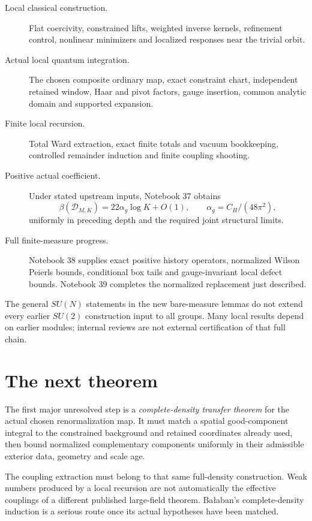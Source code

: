 \documentclass[11pt]{article}
\theoremstyle{remark}
\begin{document}
\begin{description}
\item[Local classical construction.]
Flat coercivity, constrained lifts, weighted
inverse kernels, refinement control, nonlinear
minimizers and localized responses near the
trivial orbit.
\item[Actual local quantum integration.]
The chosen composite ordinary map, exact
constraint chart, independent retained window,
Haar and pivot factors, gauge insertion,
common analytic domain and supported expansion.
\item[Finite local recursion.]
Total Ward extraction, exact finite totals
and vacuum bookkeeping, controlled remainder
induction and finite coupling shooting.
\item[Positive actual coefficient.]
Under stated upstream inputs, Notebook 37
obtains
\[
 \beta(\mathcal D_{M,K})=22\alpha_g\log K+O(1),
 \qquad \alpha_g=C_H/(48\pi^2),
\]
uniformly in preceding depth and the
required joint structural limits.
\item[Full finite-measure progress.]
Notebook 38 supplies exact positive history
operators, normalized Wilson Peierls bounds,
conditional box tails and gauge-invariant
local defect bounds. Notebook 39 completes
the normalized replacement just described.
\end{description}

The general \(SU(N)\) statements in the new
bare-measure lemmas do not extend every
earlier \(SU(2)\) construction input to all
groups. Many local results depend on
earlier modules; internal reviews are not
external certification of that full chain.

\section*{The next theorem}

The first major unresolved step is a
\emph{complete-density transfer theorem}
for the actual chosen renormalization map.
It must match a spatial good-component
integral to the constrained background
and retained coordinates already used,
then bound normalized complementary
components uniformly in their admissible
exterior data, geometry and scale age.

The coupling extraction must belong to
that same full-density construction.
Weak numbers produced by a local
recursion are not automatically the
effective couplings of a different
published large-field theorem.
Ba{\l}aban's complete-density induction
is a serious route once its actual
hypotheses have been matched.
\end{document}
